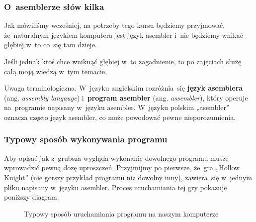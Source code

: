 \documentclass[10pt,t]{beamer}
\begin{document}
\begin{frame}
  \frametitle{O~asemblerze słów kilka}


  Jak mówiliśmy wcześniej, na potrzeby tego kursu będziemy przyjmować,
  że~naturalnym językiem komputera jest język asembler i~nie będziemy
  wnikać głębiej w~to co~się tam dzieje.

  Jeśli jednak ktoś chce wniknąć głębiej w~to zagadnienie, to po zajęciach
  służę całą moją wiedzą w~tym temacie.

  \alert{Uwaga terminologiczna.} W~języku angielskim rozróżnia~się
  \textbf{język asemblera} (ang. \textit{assembly langauge})
  i~\textbf{program asembler} (ang. \textit{assembler}), który operuje
  na~programie napisany w~języku asembler. W~języku polskim „asembler”
  oznacza często język asembler, co może powodować pewne nieporozumienia.

\end{frame}





\begin{frame}
  \frametitle{Typowy sposób wykonywania programu}


  Aby opisać jak z~grubsza wygląda wykonanie dowolnego programu muszę
  wprowadzić pewną dozę uproszczeń. Przyjmijmy po pierwsze, że~gra „Hollow
  Knight” (nie gorszy przykład programu niż dowolny inny), zawiera~się
  w~jednym pliku napisany w~języku asembler. Proces uruchamiania tej
  gry pokazuje poniższy diagram.





  \begin{figure}


    \caption{Typowy sposób uruchamiania programu na naszym komputerze}


  \end{figure}

\end{frame}
\end{document}
